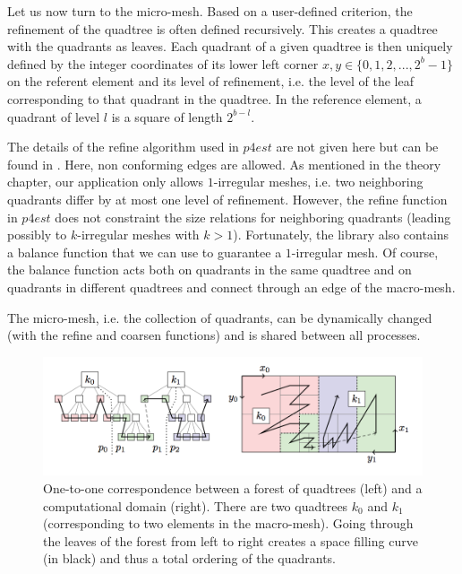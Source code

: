 Let us now turn to the micro-mesh. Based on a user-defined criterion, the refinement of the quadtree is often defined recursively. This creates a quadtree with the quadrants as leaves. Each quadrant of a given quadtree is then uniquely defined by the integer coordinates of its lower left corner $x,y \in \{0,1,2,...,2^b-1\}$ on the referent element and its level of refinement, i.e. the level of the leaf corresponding to that quadrant in the quadtree. In the reference element, a quadrant of level $l$ is a square of length $2^{b-l}$.


The details of the refine algorithm used in $p4est$ are not given here but can be found in \cite{p4est}. Here, non conforming edges are allowed. As mentioned in the theory chapter, our application only allows $1$-irregular meshes, i.e. two neighboring quadrants differ by at most one level of refinement. However, the refine function in $p4est$ does not constraint the size relations for neighboring quadrants (leading possibly to $k$-irregular meshes with $k>1$). Fortunately, the library also contains a balance function that we can use to guarantee a $1$-irregular mesh. Of course, the balance function acts both on quadrants in the same quadtree and on quadrants in different quadtrees and connect through an edge of the macro-mesh. 

The micro-mesh, i.e. the collection of quadrants, can be dynamically changed (with the refine and coarsen functions) and is shared between all processes. 

\begin{figure}
\centering
\includegraphics[scale=1.0]{Implementation/filling_curve.png}
\caption{One-to-one correspondence between a forest of quadtrees (left) and a computational domain (right). There are two quadtrees $k_0$ and $k_1$ (corresponding to two elements in the macro-mesh). Going through the leaves of the forest from left to right creates a space filling curve (in black) and thus a total ordering of the quadrants. }
\label{filling_curve}
\end{figure}

